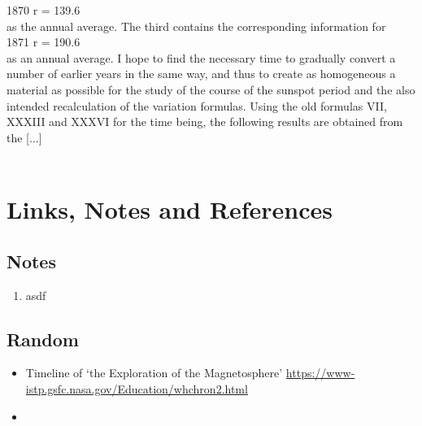 \documentclass[12pt]{article}
\begin{document}
1870 r = 139.6\\

as the annual average. The third contains the corresponding information for\\

1871 r = 190.6\\

as an annual average. I hope to find the necessary time to gradually convert a number of earlier years in the same way, and thus to create as homogeneous a material as possible for the study of the course of the sunspot period and the also intended recalculation of the variation formulas. Using the old formulas VII, XXXIII and XXXVI for the time being, the following results are obtained from the [...]\\

\\


\section{Links, Notes and References}

\subsection{Notes}
\begin{enumerate}
    \item asdf
\end{enumerate}

\subsection{Random}

\begin{itemize}
    \item Timeline of `the Exploration of the Magnetosphere' \href{https://www-istp.gsfc.nasa.gov/Education/whchron2.html}{https://www-istp.gsfc.nasa.gov/Education/whchron2.html}
    \item 
\end{itemize}
\end{document}
